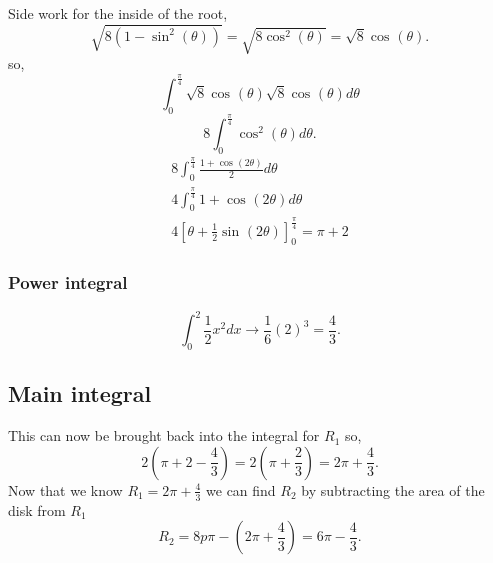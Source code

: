 \documentclass[a4paper]{article}
\begin{document}
\subsubsection{}
Side work for the inside of the root, 
\[
  \sqrt{8(1-\sin^{2}(\theta))}=\sqrt{8\cos^{2}(\theta)}=\sqrt{8}\cos^{}(\theta)
.\] 
so,
\[
\int_{0}^{\frac{\pi}{4}} \sqrt{8}\cos^{}(\theta)\sqrt{8}\cos^{}(\theta)d\theta 
\]
\[
8 \int_{0}^{\frac{\pi}{4}} \cos^{2}(\theta)d\theta 
.\] 
\newpage
\begin{gather*}
8 \int_{0}^{\frac{\pi}{4}} \frac{1+\cos^{}(2\theta)}{2}d\theta \\
4 \int_{0}^{\frac{\pi}{4}} 1+\cos^{}(2\theta)d\theta \\
4\left[\theta + \frac{1}{2}\sin^{}(2\theta)\right]_{0}^{\frac{\pi}{4}} = \pi + 2
\end{gather*}
\subsubsection{Power integral}
\[
\int_{0}^{2} \frac{1}{2}x^2dx \to \frac{1}{6}(2)^3= \frac{4}{3} 
.\] 
\subsection{Main integral}%
\label{sec:Main integral}

This can now be brought back into the integral for $R_1$ so,
\[
2(\pi+2 - \frac{4}{3}) = 2(\pi+\frac{2}{3}) = 2\pi+\frac{4}{3}
.\] 
Now that we know $R_1=2\pi + \frac{4}{3}$ we can find $R_2$ by subtracting the area of the disk from $R_1$ 
\[
  R_2=8p\pi-\left(2\pi+\frac{4}{3}\right)=6\pi-\frac{4}{3}
.\] 
\end{document}
